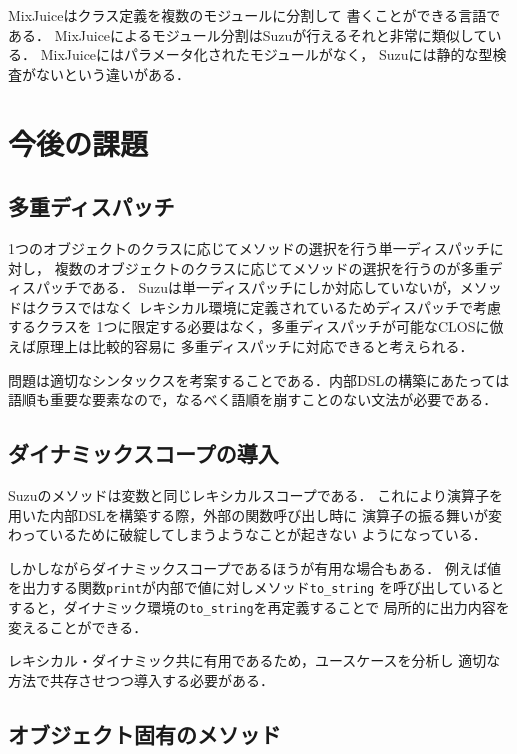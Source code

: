 \documentclass[a4paper,11pt,dvipdfmx]{jreport}
\begin{document}
MixJuice\cite{Ichisugi:2002}はクラス定義を複数のモジュールに分割して
書くことができる言語である．
MixJuiceによるモジュール分割はSuzuが行えるそれと非常に類似している．
MixJuiceにはパラメータ化されたモジュールがなく，
Suzuには静的な型検査がないという違いがある．


\chapter{今後の課題}
\label{chapter:future-work}

\section{多重ディスパッチ}

1つのオブジェクトのクラスに応じてメソッドの選択を行う単一ディスパッチに対し，
複数のオブジェクトのクラスに応じてメソッドの選択を行うのが多重ディスパッチである．
Suzuは単一ディスパッチにしか対応していないが，メソッドはクラスではなく
レキシカル環境に定義されているためディスパッチで考慮するクラスを
1つに限定する必要はなく，多重ディスパッチが可能なCLOSに倣えば原理上は比較的容易に
多重ディスパッチに対応できると考えられる．

問題は適切なシンタックスを考案することである．内部DSLの構築にあたっては
語順も重要な要素なので，なるべく語順を崩すことのない文法が必要である．

\section{ダイナミックスコープの導入}

Suzuのメソッドは変数と同じレキシカルスコープである．
これにより演算子を用いた内部DSLを構築する際，外部の関数呼び出し時に
演算子の振る舞いが変わっているために破綻してしまうようなことが起きない
ようになっている．

しかしながらダイナミックスコープであるほうが有用な場合もある．
例えば値を出力する関数\verb|print|が内部で値に対しメソッド\verb|to_string|
を呼び出しているとすると，ダイナミック環境の\verb|to_string|を再定義することで
局所的に出力内容を変えることができる．

レキシカル・ダイナミック共に有用であるため，ユースケースを分析し
適切な方法で共存させつつ導入する必要がある．

\section{オブジェクト固有のメソッド}
\end{document}
